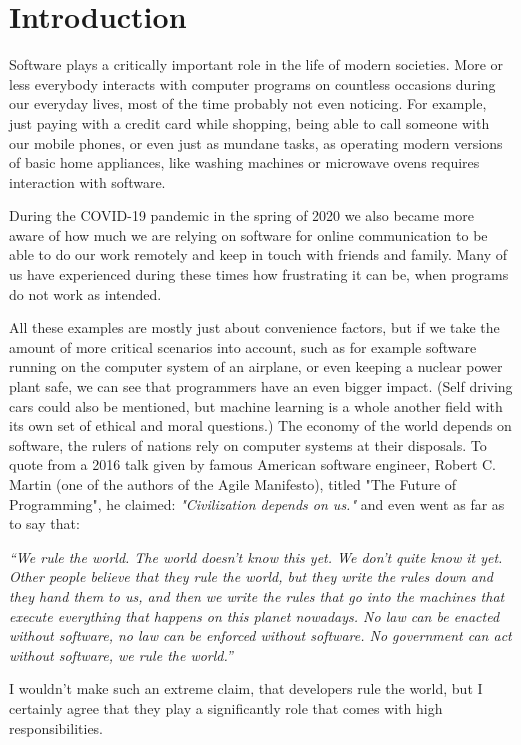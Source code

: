 \chapter{Introduction}

Software plays a critically important role in the life of modern societies. More or less everybody interacts with computer programs on countless occasions during our everyday lives, most of the time probably not even noticing. For example, just paying with a credit card while shopping, being able to call someone with our mobile phones, or even just as mundane tasks, as operating modern versions of basic home appliances, like washing machines or microwave ovens requires interaction with software.


During the COVID-19 pandemic in the spring of 2020 we also became more aware of how much we are relying on software for online communication to be able to do our work remotely and keep in touch with friends and family. Many of us have experienced during these times how frustrating it can be, when programs do not work as intended.

All these examples are mostly just about convenience factors, but if we take the amount of more critical scenarios into account, such as for example software running on the computer system of an airplane, or even keeping a nuclear power plant safe, we can see that programmers have an even bigger impact. (Self driving cars could also be mentioned, but machine learning is a whole another field with its own set of ethical and moral questions.) The economy of the world depends on software, the rulers of nations rely on computer systems at their disposals. To quote from a 2016 talk given by famous American software engineer, Robert C. Martin (one of the authors of the Agile Manifesto), titled "The Future of Programming", he claimed: \textit{"Civilization depends on us."} and even went as far as to say that:

\textit{``We rule the world. The world doesn't know this yet. We don't quite know it yet. Other people believe that they rule the world, but they write the rules down and they hand them to us, and then we write the rules that go into the machines that execute everything that happens on this planet nowadays. No law can be enacted without software, no law can be enforced without software. No government can act without software, we rule the world.''}

I wouldn't make such an extreme claim, that developers rule the world, but I certainly agree that they play a significantly role that comes with high responsibilities.

